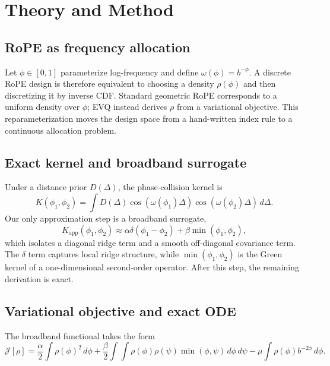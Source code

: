 \section{Theory and Method}

\subsection{RoPE as frequency allocation}

Let \(\phi \in [0,1]\) parameterize log-frequency and define \(\omega(\phi) = b^{-\phi}\). A discrete RoPE design is therefore equivalent to choosing a density \(\rho(\phi)\) and then discretizing it by inverse CDF. Standard geometric RoPE corresponds to a uniform density over \(\phi\); EVQ instead derives \(\rho\) from a variational objective. This reparameterization moves the design space from a hand-written index rule to a continuous allocation problem.

\subsection{Exact kernel and broadband surrogate}

Under a distance prior \(D(\Delta)\), the phase-collision kernel is
\begin{equation}
K(\phi_1,\phi_2)
=
\int D(\Delta)\cos(\omega(\phi_1)\Delta)\cos(\omega(\phi_2)\Delta)\,d\Delta.
\end{equation}
Our only approximation step is a broadband surrogate,
\begin{equation}
K_{\mathrm{app}}(\phi_1,\phi_2)
\approx
\alpha \delta(\phi_1-\phi_2) + \beta \min(\phi_1,\phi_2),
\end{equation}
which isolates a diagonal ridge term and a smooth off-diagonal covariance term. The \(\delta\) term captures local ridge structure, while \(\min(\phi_1,\phi_2)\) is the Green kernel of a one-dimensional second-order operator. After this step, the remaining derivation is exact.

\subsection{Variational objective and exact ODE}

The broadband functional takes the form
\begin{equation}
\mathcal{J}[\rho]
=
\frac{\alpha}{2}\int \rho(\phi)^2\,d\phi
+
\frac{\beta}{2}\int\!\!\int \rho(\phi)\rho(\psi)\min(\phi,\psi)\,d\phi\,d\psi
-
\mu\int \rho(\phi)b^{-2\phi}\,d\phi.
\end{equation}


